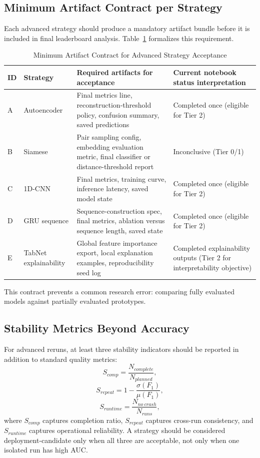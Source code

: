 \documentclass[10pt,journal]{IEEEtran}
\begin{document}
\subsection{Minimum Artifact Contract per Strategy}
Each advanced strategy should produce a mandatory artifact bundle before it is included in final leaderboard analysis. Table~\ref{tab:artifact_contract} formalizes this requirement.

\begin{table}[!t]
\caption{Minimum Artifact Contract for Advanced Strategy Acceptance}
\label{tab:artifact_contract}
\centering
\begin{tabular}{p{1.0cm}p{2.6cm}p{4.8cm}p{5.0cm}}
\toprule
ID & Strategy & Required artifacts for acceptance & Current notebook status interpretation \\
\midrule
A & Autoencoder & Final metrics line, reconstruction-threshold policy, confusion summary, saved predictions & Completed once (eligible for Tier 2) \\
B & Siamese & Pair sampling config, embedding evaluation metric, final classifier or distance-threshold report & Inconclusive (Tier 0/1) \\
C & 1D-CNN & Final metrics, training curve, inference latency, saved model state & Completed once (eligible for Tier 2) \\
D & GRU sequence & Sequence-construction spec, final metrics, ablation versus sequence length, saved state & Completed once (eligible for Tier 2) \\
E & TabNet explainability & Global feature importance export, local explanation examples, reproducibility seed log & Completed explainability outputs (Tier 2 for interpretability objective) \\
\bottomrule
\end{tabular}
\end{table}

This contract prevents a common research error: comparing fully evaluated models against partially evaluated prototypes.

\subsection{Stability Metrics Beyond Accuracy}
For advanced reruns, at least three stability indicators should be reported in addition to standard quality metrics:
\begin{equation}
S_{comp}=\frac{N_{complete}}{N_{planned}},
\end{equation}
\begin{equation}
S_{repeat}=1-\frac{\sigma(F_1)}{\mu(F_1)},
\end{equation}
\begin{equation}
S_{runtime}=\frac{N_{no\ crash}}{N_{runs}},
\end{equation}
where $S_{comp}$ captures completion ratio, $S_{repeat}$ captures cross-run consistency, and $S_{runtime}$ captures operational reliability. A strategy should be considered deployment-candidate only when all three are acceptable, not only when one isolated run has high AUC.
\end{document}
